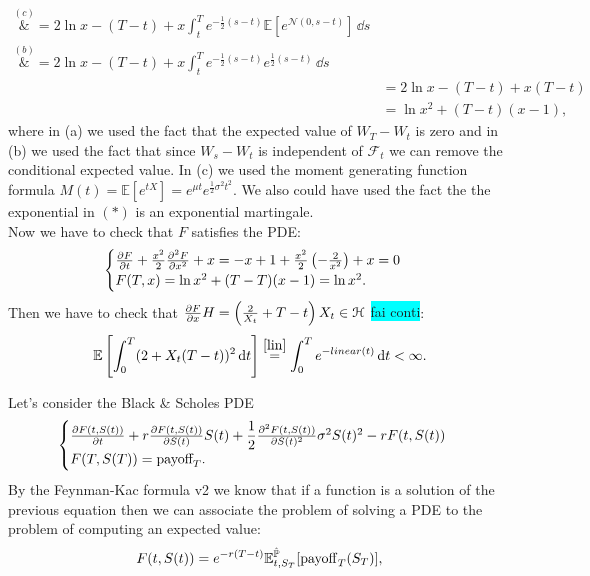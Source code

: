 \begin{example}{}{}{}
\begin{align*}
        \overset{(c)}&{=}
        2\ln x - (T-t) + x\int^T_t e^{-\frac{1}{2}(s-t)} \mathbb{E}\left[e^{\mathcal{N}(0,s-t)}\right] \,\dd s \\
        \overset{(b)}&{=}
        2\ln x - (T-t) + x\int^T_t e^{-\frac{1}{2}(s-t)}e^{\frac{1}{2}(s-t)} \,\dd s \\
        &=
        2\ln x - (T-t) + x(T-t) \\
        &=
        \ln x^2 + (T-t)(x-1),
    \end{align*}
    where in (a) we used the fact that the expected value of $W_T-W_t$ is zero and in (b) we used the fact that since $W_s-W_t$ is independent of $\mathcal{F}_t$ we can remove the conditional expected value. In (c) we used the moment generating function formula ${M(t)=\mathbb{E}[e^{tX}]=e^{\mu t}e^{{\frac {1}{2}}\sigma^{2}t^{2}}}$. We also could have used the fact the the exponential in $(*)$ is an exponential martingale.\\
    Now we have to check that $F$ satisfies the PDE:
    \begin{equation*}
        \begin{cases}
        \pdv{F}{t}(t,x) + \frac{x^2}{2}\pdv[2]{F}{x}(t,x) + x = -x+1+\frac{x^2}{2}\left(-\frac{2}{x^2}\right)+x = 0\\
        F(T,x) = \ln x^2 + (T-T)(x-1) = \ln x^2.
        \end{cases}
    \end{equation*}
    Then we have to check that $\pdv{F}{x}H = \left(\frac{2}{X_t}+T-t\right)X_t\in\mathcal{H}$ \colorbox{cyan}{fai conti}:
    \begin{equation*}
        \mathbb{E}\left[\int^T_0 (2 + X_t(T-t))^2\,\dd t\right] \overset{\eqref{lin}}{=} \int^T_0 e^{-linear(t)}\,\dd t < \infty.
    \end{equation*}
\end{example}
Let's consider the Black \& Scholes PDE
\begin{equation}
    \begin{cases}
    \pdv{F(t,S(t))}{t} + r\pdv{F(t,S(t))}{S(t)} S(t) + \dfrac{1}{2}\pdv[2]{F(t,S(t))}{S(t)}\sigma^2S(t)^2 - rF(t,S(t))\\
    F(T,S(T)) = \mbox{payoff}_T.
    \end{cases}
\end{equation}
By the Feynman-Kac formula v2 we know that if a function is a solution of the previous equation then we can associate the problem of solving a PDE to the problem of computing an expected value:
\begin{equation}
    F(t,S(t)) = e^{-r(T-t)}\mathbb{E}^{\hat{\mathbb{P}}}_{t,S_T}[\operatorname{payoff}_T(S_T)],
\end{equation}
